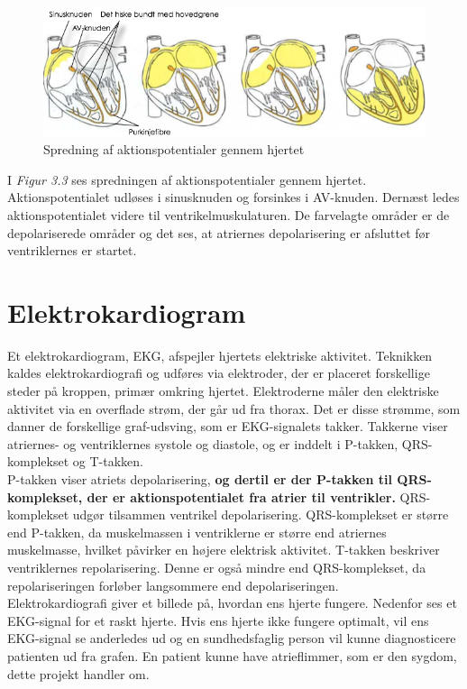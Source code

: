 \begin{figure}[htb]

	\centering	
	\includegraphics[width=1\textwidth]{Figurer/Snip20150410_6}
	\caption{Spredning af aktionspotentialer gennem hjertet \protect\footnotemark}
\end{figure}

I \textit{Figur 3.3} ses spredningen af aktionspotentialer gennem hjertet. Aktionspotentialet udløses i sinusknuden og forsinkes i AV-knuden. Dernæst ledes aktionspotentialet videre til ventrikelmuskulaturen. De farvelagte områder er de depolariserede områder og det ses, at atriernes depolarisering er afsluttet før ventriklernes er startet.

\section{Elektrokardiogram}
Et elektrokardiogram, EKG, afspejler hjertets elektriske aktivitet. Teknikken kaldes elektrokardiografi og udføres via elektroder, der er placeret forskellige steder på kroppen, primær omkring hjertet. Elektroderne måler den elektriske aktivitet via en overflade strøm, der går ud fra thorax. Det er disse strømme, som danner de forskellige graf-udsving, som er EKG-signalets takker. Takkerne viser atriernes- og ventriklernes systole og diastole, og er inddelt i P-takken, QRS-komplekset og T-takken. \\
P-takken viser atriets depolarisering, \textbf{og dertil er der P-takken til QRS-komplekset, der er aktionspotentialet fra atrier til ventrikler.} QRS-komplekset udgør tilsammen ventrikel depolarisering. QRS-komplekset er større end P-takken, da muskelmassen i ventriklerne er større end atriernes muskelmasse, hvilket påvirker en højere elektrisk aktivitet. T-takken beskriver ventriklernes repolarisering. Denne er også mindre end QRS-komplekset, da repolariseringen forløber langsommere end depolariseringen.\\
Elektrokardiografi giver et billede på, hvordan ens hjerte fungere. Nedenfor ses et EKG-signal for et raskt hjerte. Hvis ens hjerte ikke fungere optimalt, vil ens EKG-signal se anderledes ud og en sundhedsfaglig person vil kunne diagnosticere patienten ud fra grafen.  En patient kunne have atrieflimmer, som er den sygdom, dette projekt handler om.  

